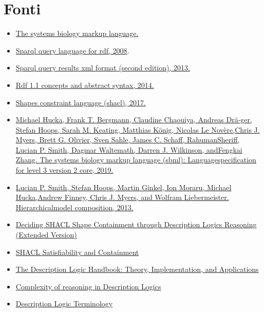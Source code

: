 \documentclass{article}
\begin{document}
\section{Fonti}
\begin{itemize}
    \item \href{http://sbml.org/Main_Page}{The systems biology markup language.}
    \item \href{https://www.w3.org/TR/rdf-sparql-query/}{Sparql query language for rdf, 2008}.  
    \item \href{https://www.w3.org/TR/rdf-sparql-XMLres/#defn-srd}{Sparql query results xml format (second edition), 2013.}
    \item \href{https://www.w3.org/TR/rdf11-concepts/#dfn-datatype}{Rdf 1.1 concepts and abstract syntax, 2014.}
    \item \href{https://www.w3.org/TR/shacl/}{Shapes constraint language (shacl), 2017.}
    \item \href{http://co.mbine.org/specifications/sbml.level-3.version-2.core.release-2.pdf}{Michael Hucka, Frank T. Bergmann, Claudine Chaouiya, Andreas Drä-ger, Stefan Hoops, Sarah M. Keating, Matthias König, Nicolas Le Novère,Chris J. Myers, Brett G. Olivier, Sven Sahle, James C. Schaff, RahumanSheriff, Lucian P. Smith, Dagmar Waltemath, Darren J. Wilkinson, andFengkai Zhang. The systems biology markup language (sbml): Languagespecification for level 3 version 2 core, 2019.} 
    \item \href{https://authors.library.caltech.edu/50975/1/sbml-comp-version-1-release-3.pdf}{Lucian P. Smith, Stefan Hoops, Martin Ginkel, Ion Moraru, Michael Hucka,Andrew Finney, Chris J. Myers, and Wolfram Liebermeister. Hierarchicalmodel composition, 2013.}
    \item \href{https://arxiv.org/pdf/2008.13603.pdf}{Deciding SHACL Shape Containment through Description Logics Reasoning (Extended Version)}
    \item \href{https://paolopareti.uk/homepage/papers/pareti_ISWC_2020.pdf}{SHACL Satisfiability and Containment}
    \item \href{https://www.researchgate.net/publication/230745455_The_Description_Logic_Handbook_Theory_Implementation_and_Applications}{The Description Logic Handbook: Theory, Implementation, and Applications}
    \item \href{http://www.cs.man.ac.uk/~ezolin/dl/}{Complexity of reasoning in Description Logics}
    \item \href{http://www.ksl.stanford.edu/people/dlm/papers/dlhb-appendix.pdf}{Description Logic Terminology}
\end{itemize}
\end{document}

